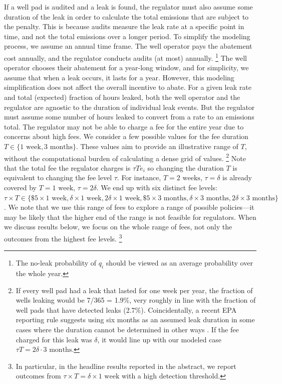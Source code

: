 \documentclass[12pt,oneside,letterpaper]{article}
\theoremstyle{definition}
\begin{document}
\begin{refsection}
If a well pad is audited and a leak is found, the regulator must also assume some duration of the leak in order to calculate the total emissions that are subject to the penalty.
This is because audits measure the leak rate at a specific point in time, and not the total emissions over a longer period.
To simplify the modeling process, we assume an annual time frame.
The well operator pays the abatement cost annually, and the regulator conducts audits (at most) annually.%
\footnote{The no-leak probability of \(q_i\) should be viewed as an average probability over the whole year.}
The well operator chooses their abatement for a year-long window, and for simplicity, we assume that when a leak occurs, it lasts for a year.
However, this modeling simplification does not affect the overall incentive to abate.
For a given leak rate and total (expected) fraction of hours leaked, both the well operator and the regulator are agnostic to the duration of individual leak events.
But the regulator must assume some number of hours leaked to convert from a rate to an emissions total.
The regulator may not be able to charge a fee for the entire year due to concerns about high fees.
We consider a few possible values for the fee duration
\(T \in \{\text{1 week}, \text{3 months}\}\).
These values aim to provide an illustrative range of \(T\), without the computational burden of calculating a dense grid of values.%
\footnote{%
If every well pad had a leak that lasted for one week per year, the fraction of wells leaking would be 7/365 = 1.9\%, very roughly in line with the fraction of well pads that have detected leaks (2.7\%).
Coincidentally, a recent EPA reporting rule suggests using six months as an assumed leak duration in some cases where the duration cannot be determined in other ways \parencite{EPA-monitoring-2023}.
If the fee charged for this leak was \(\delta\), it would line up with our modeled case \(\tau T = 2 \delta \cdot \text{3 months}\).
}
Note that the total fee the regulator charges is \(\tau T e_i\) so changing the duration \(T\) is equivalent to changing the fee level \(\tau\).
For instance, \(T = \text{2 weeks}\), \(\tau = \delta\) is already covered by \(T = \text{1 week}\), \(\tau = 2\delta\).
We end up with six distinct fee levels:
\(\tau \times T \in \{
\text{\$5}\times \text{1 week},
\delta\times \text{1 week},
\text{2}\delta\times \text{1 week},
\text{\$5}\times \text{3 months},
\delta\times \text{3 months},
\text{2}\delta\times \text{3 months}
\}\).
We note that we use this range of fees to explore a range of possible policies---it may be likely that the higher end of the range is not feasible for regulators.
When we discuss results below, we focus on the whole range of fees, not only the outcomes from the highest fee levels.%
\footnote{In particular, in the headline results reported in the abstract, we report outcomes from
\(\tau \times T = \delta \times \text{1 week}\) with a high detection threshold.
}


\end{refsection}
\end{document}
